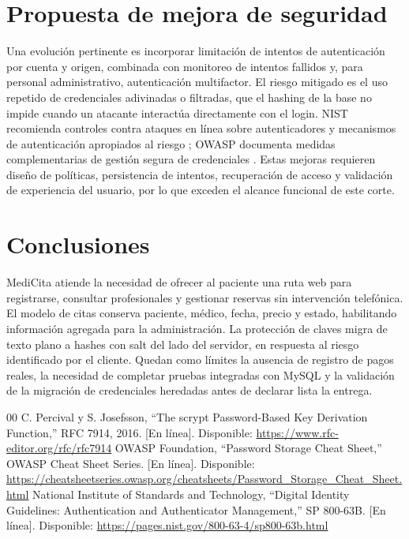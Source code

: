 \documentclass[conference]{IEEEtran}
\begin{document}
\section{Propuesta de mejora de seguridad}
Una evolución pertinente es incorporar limitación de intentos de autenticación por cuenta y origen, combinada con monitoreo de intentos fallidos y, para personal administrativo, autenticación multifactor. El riesgo mitigado es el uso repetido de credenciales adivinadas o filtradas, que el hashing de la base no impide cuando un atacante interactúa directamente con el login. NIST recomienda controles contra ataques en línea sobre autenticadores y mecanismos de autenticación apropiados al riesgo \cite{nist}; OWASP documenta medidas complementarias de gestión segura de credenciales \cite{owasp}. Estas mejoras requieren diseño de políticas, persistencia de intentos, recuperación de acceso y validación de experiencia del usuario, por lo que exceden el alcance funcional de este corte.
\section{Conclusiones}
MediCita atiende la necesidad de ofrecer al paciente una ruta web para registrarse, consultar profesionales y gestionar reservas sin intervención telefónica. El modelo de citas conserva paciente, médico, fecha, precio y estado, habilitando información agregada para la administración. La protección de claves migra de texto plano a hashes con salt del lado del servidor, en respuesta al riesgo identificado por el cliente. Quedan como límites la ausencia de registro de pagos reales, la necesidad de completar pruebas integradas con MySQL y la validación de la migración de credenciales heredadas antes de declarar lista la entrega.
\begin{thebibliography}{00}
 C. Percival y S. Josefsson, ``The scrypt Password-Based Key Derivation Function,'' RFC 7914, 2016. [En línea]. Disponible: \url{https://www.rfc-editor.org/rfc/rfc7914}
 OWASP Foundation, ``Password Storage Cheat Sheet,'' OWASP Cheat Sheet Series. [En línea]. Disponible: \url{https://cheatsheetseries.owasp.org/cheatsheets/Password_Storage_Cheat_Sheet.html}
 National Institute of Standards and Technology, ``Digital Identity Guidelines: Authentication and Authenticator Management,'' SP 800-63B. [En línea]. Disponible: \url{https://pages.nist.gov/800-63-4/sp800-63b.html}
\end{thebibliography}
\end{document}

